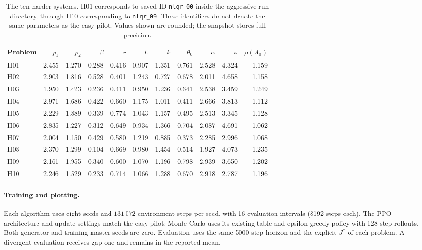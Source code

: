 \documentclass[11pt]{article}
\begin{document}
\begin{table}[H]
\centering\scriptsize
\begin{tabular}{@{}lrrrrrrrrrr@{}}
\toprule
Problem & $p_1$ & $p_2$ & $\beta$ & $r$ & $h$ & $k$ & $\theta_0$ & $\alpha$ & $\kappa$ & $\rho(A_0)$ \\
\midrule
H01 & 2.455 & 1.270 & 0.288 & 0.416 & 0.907 & 1.351 & 0.761 & 2.528 & 4.324 & 1.159 \\
H02 & 2.903 & 1.816 & 0.528 & 0.401 & 1.243 & 0.727 & 0.678 & 2.011 & 4.658 & 1.158 \\
H03 & 1.950 & 1.423 & 0.236 & 0.411 & 0.950 & 1.236 & 0.641 & 2.538 & 3.459 & 1.249 \\
H04 & 2.971 & 1.686 & 0.422 & 0.660 & 1.175 & 1.011 & 0.411 & 2.666 & 3.813 & 1.112 \\
H05 & 2.229 & 1.889 & 0.339 & 0.774 & 1.043 & 1.157 & 0.495 & 2.513 & 3.345 & 1.128 \\
H06 & 2.835 & 1.227 & 0.312 & 0.649 & 0.934 & 1.366 & 0.704 & 2.087 & 4.691 & 1.062 \\
H07 & 2.004 & 1.150 & 0.429 & 0.580 & 1.219 & 0.885 & 0.373 & 2.285 & 2.996 & 1.068 \\
H08 & 2.370 & 1.299 & 0.104 & 0.669 & 0.980 & 1.454 & 0.514 & 1.927 & 4.073 & 1.235 \\
H09 & 2.161 & 1.955 & 0.340 & 0.600 & 1.070 & 1.196 & 0.798 & 2.939 & 3.650 & 1.202 \\
H10 & 2.246 & 1.529 & 0.233 & 0.714 & 1.066 & 1.288 & 0.670 & 2.918 & 2.787 & 1.196 \\
\bottomrule
\end{tabular}
\caption{The ten harder systems. H01 corresponds to saved ID \texttt{nlqr\_00}
inside the aggressive run directory, through H10 corresponding to \texttt{nlqr\_09}.
These identifiers do not denote the same parameters as the easy pilot. Values shown
are rounded; the snapshot stores full precision.}
\label{tab:hard-parameters}
\end{table}


\paragraph{Training and plotting.}
Each algorithm uses eight seeds and $131\,072$ environment steps per seed,
with 16 evaluation intervals (8192 steps each). The PPO architecture and update
settings match the easy pilot; Monte Carlo uses its existing table and epsilon-greedy
policy with 128-step rollouts. Both generator and training master seeds are zero.
Evaluation uses the same 5000-step horizon and the explicit $J^*$ of each problem.
A divergent evaluation receives gap one and remains in the reported mean.
\end{document}
